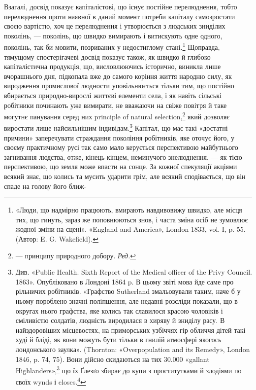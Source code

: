 Взагалі, досвід показує капіталістові, що існує постійне
перелюднення, тобто перелюднення проти наявної в даний момент
потреби капіталу самозростати своєю вартістю, хоч це перелюднення
і утворюється з людських зниділих поколінь, — поколінь,
що швидко вимирають і витискують одне одного, поколінь, так
би мовити, позриваних у недостиглому стані.\footnote{
«Люди, що надмірно працюють, вмирають навдивовижу швидко,
але місця тих, що гинуть, зараз же поповнюються знов, і часта зміна
осіб не зумовлює жодної зміни на сцені». «England and America»,
London 1833, vol. I, p. 55. (Автор: E. G. Wakefield).
} Щоправда,
тямущому спостерігачеві досвід показує також, як швидко
й глибоко капіталістична продукція, що, висловлюючись історично,
виникла лише вчорашнього дня, підкопала вже до
самого коріння життя народню силу, як виродження промислової
людности уповільнюється тільки тим, що постійно вбирається
природно-вирослі життєві елементи села, і як навіть сільські
робітники починають уже вимирати, не вважаючи на свіже повітря
й таке могутнє панування серед них principle of natural selection,\footnote*{
— принципу природного добору. \emph{Ред.}
}
який дозволяє виростати лише найсильнішим індивідам.\footnote{
Див. «Public Health. Sixth Report of the Medical officer of the
Privy Council. 1863». Опубліковано в Лондоні 1864 p. В цьому звіті
мова йде саме про рільничих робітників. «Графство Sutherland змальовували
таким, наче б у ньому пороблено значні поліпшення, але недавні
розсліди показали, що в округах нього графства, яке колись так славилося
красою чоловіків і сміливістю солдатів, людність виродилася в
хиряву й зниділу расу. В найздоровіших місцевостях, на приморських
узбіччях гір обличчя дітей такі худі й бліді, як вони можуть бути
тільки в гнилій атмосфері якогось лондонського заулка». (Thornton:
«Overpopulation and its Remedy», London 1846, p. 74, 75). Вони дійсно
скидаються на тих 30.000 «gallant Highlanders»,\footnote*{
— бравих горян. \emph{Ред.}
} що їх Ґлезґо збирає
до купи з проститутками й злодіями по своїх wynds і closes.\footnote*{
— заулках і вертепах. \emph{Ред.}
}
}
Капітал, що має такі «достатні причини» заперечувати страждання
покоління робітників, яке оточує його, у своєму практичному
русі так само мало керується перспективою майбутнього загнивання
людства, отже, кінець-кінцем, неминучого знелюднення, —
як тією перспективою, що земля може впасти на сонце. За кожної
спекуляції акціями всякий знає, що колись та мусить ударити
грім, але всякий сподівається, що він спаде на голову його ближ-
